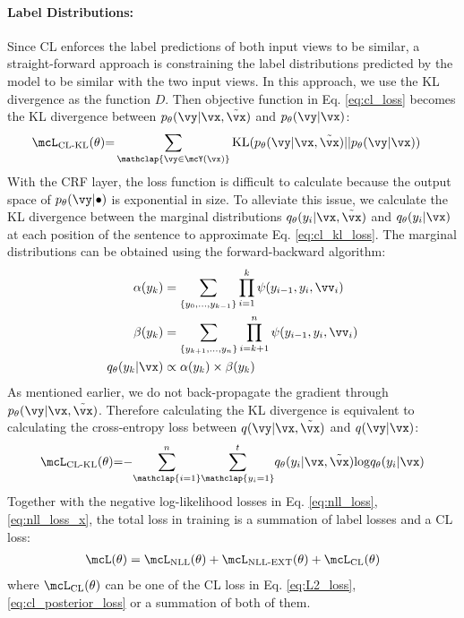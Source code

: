 \paragraph{Label Distributions:} Since CL enforces the label predictions of both input views to be similar, a straight-forward approach is constraining the label distributions predicted by the model to be similar with the two input views. In this approach, we use the KL divergence as the function $D$. Then objective function in Eq. \ref{eq:cl_loss} becomes the KL divergence between $p_\theta(\vy|\vx, \tilde{\vx})$ and $p_\theta(\vy|\vx)$:
\begin{align}
\mcL_{\text{CL-KL}}(\theta)&{=}\sum_{\mathclap{\vy \in \mcY(\vx)}} \text{KL}(p_\theta(\vy|\vx, \tilde{\vx})||p_\theta(\vy|\vx)) \label{eq:cl_kl_loss}
\end{align}
With the CRF layer, the loss function is difficult to calculate because the output space of $p_\theta(\vy|\bullet)$ is exponential in size. To alleviate this issue, we calculate the KL divergence between the marginal distributions $q_\theta(y_i|\vx,\tilde{\vx})$ and $q_\theta(y_i|\vx)$ at each position of the sentence to approximate Eq. \ref{eq:cl_kl_loss}. The marginal distributions can be obtained using the forward-backward algorithm:
\begin{align}
\alpha(y_k)&=\sum\limits_{\{y_0,\dots,y_{k-1}\}} \prod\limits_{i=1}^{k} \psi(y_{i-1}, y_i, \vv_i)\nonumber\\
\beta(y_k) &= \sum\limits_{\{y_{k+1},\dots,y_n\}} \prod\limits_{i=k+1}^{n} \psi(y_{i-1}, y_i, \vv_i)\nonumber\\
q_\theta(y_k|\vx)
&\propto \alpha(y_k) \times \beta(y_k) \label{eq:posterior}  %
\end{align}
As mentioned earlier, we do not back-propagate the gradient through $p_\theta(\vy|\vx, \tilde{\vx})$. Therefore calculating the KL divergence is equivalent to calculating the cross-entropy loss between $q(\vy|\vx, \tilde{\vx})$ and $q(\vy|\vx)$:
\begin{align}
\mcL_{\text{CL-KL}}{(}\theta{)}{=}{-}{\sum_{\mathclap{i=1}}^{n}}{\sum_{\mathclap{y_i=1}}^{t}} q_\theta(y_i|\vx,\tilde{\vx}){\log} q_\theta(y_i|\vx) \label{eq:cl_posterior_loss}
\end{align}
Together with the negative log-likelihood losses in Eq. \ref{eq:nll_loss}, \ref{eq:nll_loss_x}, the total loss in training is a summation of label losses and a CL loss:
\begin{align}
\mcL(\theta) = \mcL_{\text{NLL}}(\theta) + \mcL_{\text{NLL-EXT}}(\theta) + \mcL_{\text{CL}}(\theta) \label{eq:final_loss}
\end{align}
where $\mcL_{\text{CL}}(\theta)$ can be one of the CL loss in Eq. \ref{eq:L2_loss}, \ref{eq:cl_posterior_loss} or a summation of both of them.

